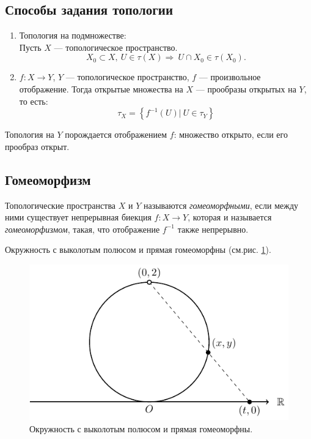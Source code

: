 \subsection{Способы задания топологии}
\begin{enumerate}
    \item Топология на подмножестве: \\
    Пусть $X$ — топологическое пространство. $$X_0 \subset X, \ U \in \tau(X) \Longrightarrow \ U \cap X_0 \in \tau(X_0).$$
    \item $f: X \to Y$, $Y$ — топологическое пространство, $f$ — произвольное отображение. Тогда открытые множества на $X$ — прообразы открытых на $Y$, то есть:
    \[\tau_X = \left\{f^{-1}(U) | \ U \in \tau_Y\right\}\]
\end{enumerate}

\begin{remark}
    Топология на $Y$ порождается отображением $f$: множество открыто, если его прообраз открыт.
\end{remark}

\subsection{Гомеоморфизм}
\begin{definition}
    Топологические пространства $X$ и $Y$ называются \textit{гомеоморфными}, если между ними существует непрерывная биекция $f: X \to Y$, которая и называется \textit{гомеоморфизмом}, такая, что отображение $f^{-1}$ также непрерывно.
\end{definition}


\begin{example}
    Окружность с выколотым полюсом и прямая гомеоморфны (см.рис. \ref{fig:c1.1}).
\end{example}

\begin{figure}
    \centering
    \includegraphics{images/c1.1.pdf}
    \caption{Окружность с выколотым полюсом и прямая гомеоморфны.}
    \label{fig:c1.1}
\end{figure}


